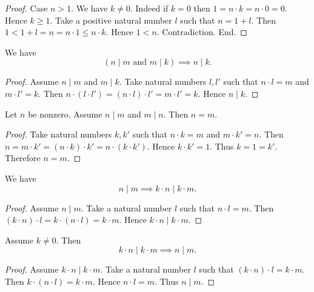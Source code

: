 \documentclass[../../natural-numbers.ftl.tex]{subfiles}
\begin{document}
\begin{forthel}
\begin{proof}
      Case $n > 1$.
        We have $k \neq 0$.
        Indeed if $k = 0$ then $1 = n \cdot k = n \cdot 0 = 0$.
        Hence $k \geq 1$.
        Take a positive natural number $l$ such that $n = 1 + l$.
        Then $1 < 1 + l = n = n \cdot 1 \leq n \cdot k$.
        Hence $1 < n$.
        Contradiction.
      End.
    \end{proof}

    \begin{proposition}[NN 03 01 364584]
      We have \[ (\text{$n \mid m$ and $m \mid k$}) \implies n \mid k. \]
    \end{proposition}
    \begin{proof}
      Assume $n \mid m$ and $m \mid k$.
      Take natural numbers $l,l'$ such that $n \cdot l = m$ and $m \cdot l' = k$.
      Then $n \cdot (l \cdot l') = (n \cdot l) \cdot l' = m \cdot l' = k$.
      Hence $n \mid k$.
    \end{proof}

    \begin{proposition}[NN 03 01 185910]
      Let $n$ be nonzero.
      Assume $n \mid m$ and $m \mid n$.
      Then $n = m$.
    \end{proposition}
    \begin{proof}
      Take natural numbers $k,k'$ such that $n \cdot k = m$ and $m \cdot k' = n$.
      Then $n = m \cdot k' = (n \cdot k) \cdot k' = n \cdot (k \cdot k')$.
      Hence $k \cdot k' = 1$.
      Thus $k = 1 = k'$.
      Therefore $n = m$.
    \end{proof}

    \begin{proposition}[NN 03 01 710814]
      We have \[ n \mid m \implies k \cdot n \mid k \cdot m. \]
    \end{proposition}
    \begin{proof}
      Assume $n \mid m$.
      Take a natural number $l$ such that $n \cdot l = m$.
      Then $(k \cdot n) \cdot l = k \cdot (n \cdot l) = k \cdot m$.
      Hence $k \cdot n \mid k \cdot m$.
    \end{proof}

    \begin{proposition}[NN 03 01 382863]
      Assume $k \neq 0$.
      Then \[ k \cdot n \mid k \cdot m \implies n \mid m. \]
    \end{proposition}
    \begin{proof}
      Assume $k \cdot n \mid k \cdot m$.
      Take a natural number $l$ such that $(k \cdot n) \cdot l = k \cdot m$.
      Then $k \cdot (n \cdot l) = k \cdot m$.
      Hence $n \cdot l = m$.
      Thus $n \mid m$.
    \end{proof}


\end{forthel}
\end{document}
